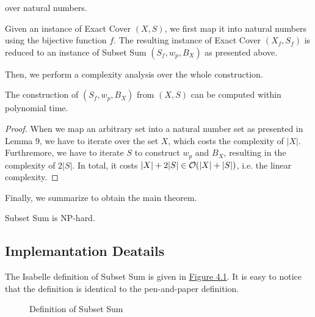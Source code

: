 over natural numbers. 
\begin{definition}
    Given an instance of Exact Cover $(X, S)$, 
    we first map it into natural numbers using the bijective function $f$. 
    The resulting instance of Exact Cover $(X_f, S_f)$ is reduced to an instance of Subset Sum $(S_f, w_p, B_X)$ as presented above.
\end{definition}
Then, we perform a complexity analysis over the whole construction.
\begin{lemma}
    The construction of $(S_f, w_p, B_X)$ from $(X, S)$ can be computed within polynomial time. 
\end{lemma}
\begin{proof}
    When we map an arbitrary set into a natural number set as presented in Lemma 9, we have to iterate over the set $X$, which costs the complexity of $|X|$. 
Furthremore, we have to iterate $S$ to construct $w_p$ and $B_X$, resulting in the complexity of $2|S|$. In total, it costs $|X| + 2|S| \in\mathcal{O}({|X| + |S|})$, 
i.e. the linear complexity. 
\end{proof}
Finally, we summarize to obtain the main theorem.
\begin{theorem}
    Subset Sum is NP-hard.
\end{theorem}

\subsection{Implemantation Deatails}
The Isabelle definition of Subset Sum is given in \hyperref[fig:4.1]{Figure 4.1}. 
It is easy to notice that the definition is identical to the pen-and-paper definition.
\begin{figure}[!h]
    \caption{Definition of Subset Sum}
    \label{fig:4.1}
\end{figure}
